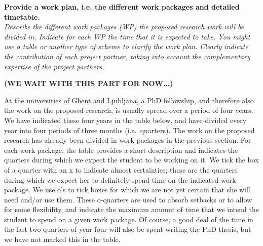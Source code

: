 \documentclass[11pt,dvipsnames,usenames,a4paper]{article}
\begin{document}
%

\vspace{7pt}

\textbf{Provide a work plan, i.e. the different work packages and detailed timetable.}\\
\textit{Describe the different work packages (WP) the proposed research work will be divided in.
Indicate for each WP the time that it is expected to take.
You might use a table or another type of scheme to clarify the work plan. Clearly indicate the contribution of each project partner, taking into account the complementary expertise of the project partners.}


{\bf\color{blue} (WE WAIT WITH THIS PART FOR NOW...)}


At the universities of Ghent and Ljubljana, a PhD fellowship, and therefore also the work on the proposed research, is usually spread over a period of four years.
We have indicated these four years in the table below, and have divided every year into four periods of three months (i.e.~quarters).
The work on the proposed research has already been divided in work packages in the previous section.
For each work package, the table provides a short description and indicates the quarters during which we expect the student to be working on it.
We tick the box of a quarter with an x to indicate almost certainties; these are the quarters during which we expect her to definitely spend time on the indicated work package.
We use o's to tick boxes for which we are not yet certain that she will need and/or use them.
These o-quarters are used to absorb setbacks or to allow for some flexibility, and indicate the maximum amount of time that we intend the student to spend on a given work package.
Of course, a good deal of the time in the last two quarters of year four will also be spent writing the PhD thesis, but we have not marked this in the table.
\end{document}
